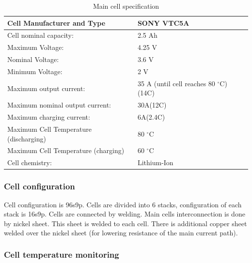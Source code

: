 \begin{table}[H]
	\centering
	\caption{Main cell specification}
	\begin{tabularx}{\textwidth}{|X|X|}
		\hline
		Cell Manufacturer and Type & SONY VTC5A \\[\TableSize]
		\hline
		Cell nominal capacity: & 2.5 Ah \\[\TableSize]
		\hline
		Maximum Voltage: & 4.25 V \\[\TableSize]
		\hline
		Nominal Voltage: & 3.6 V \\[\TableSize]
		\hline
		Minimum Voltage:  & 2 V \\[\TableSize]
		\hline
		Maximum output current: & 35 A (until cell reaches 80 $^\circ$C) (14C)\\[\TableSize]
		\hline
		Maximum nominal output current: & 30A(12C) \\[\TableSize]
		\hline
		Maximum charging current: & 6A(2.4C) \\[\TableSize]
		\hline
		Maximum Cell Temperature (discharging) & 80 $^\circ$C \\[\TableSize]
		\hline
		Maximum Cell Temperature (charging) & 60 $^\circ$C \\[\TableSize]
		\hline
		Cell chemistry: & Lithium-Ion \\[\TableSize]
		\hline
	\end{tabularx}%
	\label{tab:acc-cell}%
\end{table}%

\subsubsection{Cell configuration}

Cell configuration is 96s9p. Cells are divided into 6 stacks, configuration of each stack is 16s9p. Cells are connected by welding. Main cells interconnection is done by nickel sheet. This sheet is welded to each cell. There is additional copper sheet welded over the nickel sheet (for lowering resistance of the main current path).

 
\subsubsection{Cell temperature monitoring}

